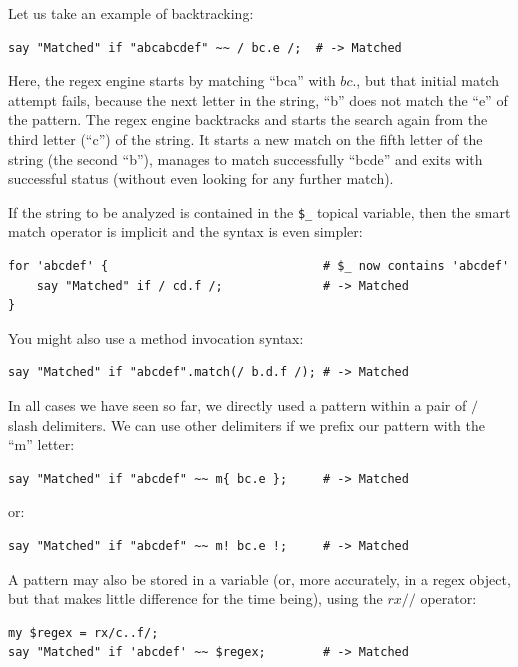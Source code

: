 Let us take an example of backtracking:
\begin{verbatim}
say "Matched" if "abcabcdef" ~~ / bc.e /;  # -> Matched
\end{verbatim}
%

Here, the regex engine starts by matching ``bca'' with 
$bc.$, but that initial match attempt fails, because the 
next letter in the string, ``b'' does not match the ``e'' 
of the pattern. The regex engine backtracks and starts the 
search again from the third letter (``c'') of the string. 
It starts a new match on the fifth letter of the string 
(the second ``b''), manages to match successfully ``bcde'' and 
exits with successful status (without even looking for any 
further match).

If the string to be analyzed is contained in the \verb'$_' 
topical variable, then the smart match operator is implicit 
and the syntax is even simpler:

\begin{verbatim}
for 'abcdef' {                              # $_ now contains 'abcdef'
    say "Matched" if / cd.f /;              # -> Matched
}
\end{verbatim}
%

You might also use a method invocation syntax:
\begin{verbatim}
say "Matched" if "abcdef".match(/ b.d.f /); # -> Matched
\end{verbatim}
%

In all cases we have seen so far, we directly used a pattern 
within a pair of $/$ slash delimiters. We can use other 
delimiters if we prefix our pattern with the ``m'' letter:

\begin{verbatim}
say "Matched" if "abcdef" ~~ m{ bc.e };     # -> Matched
\end{verbatim}
%

or:
\begin{verbatim}
say "Matched" if "abcdef" ~~ m! bc.e !;     # -> Matched
\end{verbatim}
%

A pattern may also be stored in a variable (or, more 
accurately, in a regex object, but that makes little 
difference for the time being), using the $rx//$ operator:

\begin{verbatim}
my $regex = rx/c..f/;
say "Matched" if 'abcdef' ~~ $regex;        # -> Matched
\end{verbatim}
%


